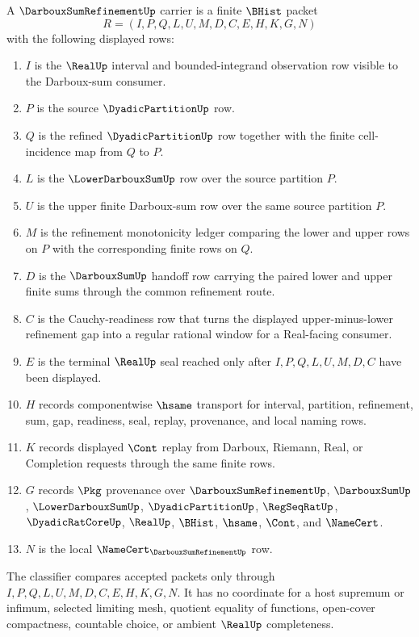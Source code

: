\begin{definition}
\label{def:darboux-sum-refinement-carrier}
A $\DarbouxSumRefinementUp$ carrier is a finite $\BHist$ packet
$$
R=(I,P,Q,L,U,M,D,C,E,H,K,G,N)
$$
with the following displayed rows:
\begin{enumerate}
\item $I$ is the $\RealUp$ interval and bounded-integrand observation row visible to the Darboux-sum consumer.
\item $P$ is the source $\DyadicPartitionUp$ row.
\item $Q$ is the refined $\DyadicPartitionUp$ row together with the finite cell-incidence map from $Q$ to $P$.
\item $L$ is the $\LowerDarbouxSumUp$ row over the source partition $P$.
\item $U$ is the upper finite Darboux-sum row over the same source partition $P$.
\item $M$ is the refinement monotonicity ledger comparing the lower and upper rows on $P$ with the corresponding finite rows on $Q$.
\item $D$ is the $\DarbouxSumUp$ handoff row carrying the paired lower and upper finite sums through the common refinement route.
\item $C$ is the Cauchy-readiness row that turns the displayed upper-minus-lower refinement gap into a regular rational window for a Real-facing consumer.
\item $E$ is the terminal $\RealUp$ seal reached only after $I,P,Q,L,U,M,D,C$ have been displayed.
\item $H$ records componentwise $\hsame$ transport for interval, partition, refinement, sum, gap, readiness, seal, replay, provenance, and local naming rows.
\item $K$ records displayed $\Cont$ replay from Darboux, Riemann, Real, or Completion requests through the same finite rows.
\item $G$ records $\Pkg$ provenance over $\DarbouxSumRefinementUp$, $\DarbouxSumUp$, $\LowerDarbouxSumUp$, $\DyadicPartitionUp$, $\RegSeqRatUp$, $\DyadicRatCoreUp$, $\RealUp$, $\BHist$, $\hsame$, $\Cont$, and $\NameCert$.
\item $N$ is the local $\NameCert_{\DarbouxSumRefinementUp}$ row.
\end{enumerate}
The classifier compares accepted packets only through $I,P,Q,L,U,M,D,C,E,H,K,G,N$. It has no coordinate for a host supremum or infimum, selected limiting mesh, quotient equality of functions, open-cover compactness, countable choice, or ambient $\RealUp$ completeness.
\end{definition}

